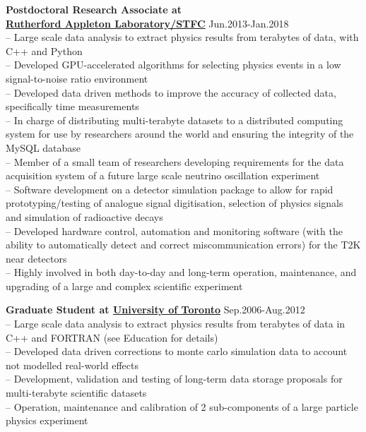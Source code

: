 \documentclass[margin,line]{resume}
\begin{document}
\begin{resume}
\begin{list2}
    \item \textbf{Postdoctoral Research Associate at \\\href{https://www.stfc.ac.uk/index.cfm}{Rutherford Appleton Laboratory/STFC}} \hfill{Jun.2013-Jan.2018}\\
      -- Large scale data analysis to extract physics results from terabytes of data, with C++ and Python\\
      -- Developed GPU-accelerated algorithms for selecting physics events in a low signal-to-noise ratio environment\\
      -- Developed data driven methods to improve the accuracy of collected data, specifically time measurements\\
      -- In charge of distributing multi-terabyte datasets to a distributed computing system for use by researchers around the world and ensuring the integrity of the MySQL database\\
      -- Member of a small team of researchers developing requirements for the data acquisition system of a future large scale neutrino oscillation experiment\\
      -- Software development on a detector simulation package to allow for rapid prototyping/testing of analogue signal digitisation, selection of physics signals and simulation of radioactive decays\\
      -- Developed hardware control, automation and monitoring software (with the ability to automatically detect and correct miscommunication errors) for the T2K near detectors\\
      -- Highly involved in both day-to-day and long-term operation, maintenance, and upgrading of a large and complex scientific experiment
    \item \textbf{Graduate Student at \href{https://www.physics.utoronto.ca/}{University of Toronto}} \hfill{Sep.2006-Aug.2012}\\
      -- Large scale data analysis to extract physics results from terabytes of data in C++ and FORTRAN (see Education for details)\\
      -- Developed data driven corrections to monte carlo simulation data to account not modelled real-world effects\\
      -- Development, validation and testing of long-term data storage proposals for multi-terabyte scientific datasets\\
      -- Operation, maintenance and calibration of 2 sub-components of a large particle physics experiment\\

\end{list2}
\end{resume}
\end{document}
